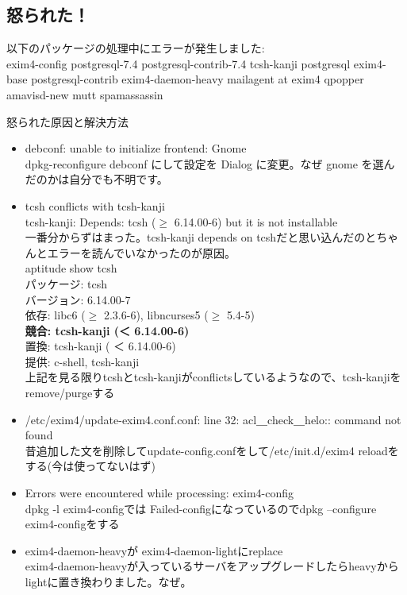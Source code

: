 \documentclass[mingoth,a4paper]{jsarticle}
\begin{document}
\subsection{怒られた！}
以下のパッケージの処理中にエラーが発生しました: \\
exim4-config postgresql-7.4 postgresql-contrib-7.4 tcsh-kanji postgresql exim4-base postgresql-contrib exim4-daemon-heavy mailagent at exim4 qpopper amavisd-new mutt spamassassin 

怒られた原因と解決方法
\begin{itemize}
\item debconf: unable to initialize frontend: Gnome\\
dpkg-reconfigure debconf にして設定を Dialog に変更。なぜ gnome を選ん
      だのかは自分でも不明です。

\item tcsh conflicts with tcsh-kanji \\
 tcsh-kanji: Depends: tcsh ($\geq $ 6.14.00-6) but it is not installable\\
一番分からずはまった。tcsh-kanji depends on tcshだと思い込んだのとちゃんとエラーを読んでいなかったのが原因。\\
aptitude show tcsh\\
パッケージ: tcsh \\
バージョン: 6.14.00-7 \\
依存: libc6 ($\geq $ 2.3.6-6), libncurses5 ($\geq $ 5.4-5) \\
{\bf 競合: tcsh-kanji (＜ 6.14.00-6)}\\
置換: tcsh-kanji ( ＜ 6.14.00-6) \\
提供: c-shell, tcsh-kanji\\
上記を見る限りtcshとtcsh-kanjiがconflictsしているようなので、tcsh-kanjiをremove/purgeする

\item /etc/exim4/update-exim4.conf.conf: line 32: acl＿check＿helo:: command not found \\
昔追加した文を削除してupdate-config.confをして/etc/init.d/exim4 reloadをする(今は使ってないはず)
\item Errors were encountered while processing: exim4-config\\
dpkg -l exim4-configでは Failed-configになっているのでdpkg --configure exim4-configをする

\item exim4-daemon-heavyが exim4-daemon-lightにreplace\\
exim4-daemon-heavyが入っているサーバをアップグレードしたらheavyからlightに置き換わりました。なぜ。


\end{itemize}
\end{document}
